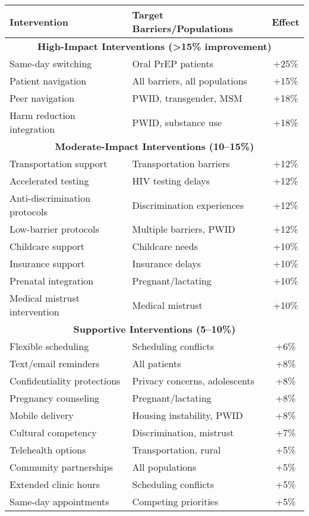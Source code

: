 \documentclass[11pt]{article}
\begin{document}
\begin{table}[h]
\small
\centering
\begin{tabular}{|p{4cm}|p{5cm}|c|}
\hline
\textbf{Intervention} & \textbf{Target Barriers/Populations} & \textbf{Effect} \\
\hline
\multicolumn{3}{|c|}{\textbf{High-Impact Interventions (>15\% improvement)}} \\
\hline
Same-day switching & Oral PrEP patients & +25\% \\
Patient navigation & All barriers, all populations & +15\% \\
Peer navigation & PWID, transgender, MSM & +18\% \\
Harm reduction integration & PWID, substance use & +18\% \\
\hline
\multicolumn{3}{|c|}{\textbf{Moderate-Impact Interventions (10--15\%)}} \\
\hline
Transportation support & Transportation barriers & +12\% \\
Accelerated testing & HIV testing delays & +12\% \\
Anti-discrimination protocols & Discrimination experiences & +12\% \\
Low-barrier protocols & Multiple barriers, PWID & +12\% \\
Childcare support & Childcare needs & +10\% \\
Insurance support & Insurance delays & +10\% \\
Prenatal integration & Pregnant/lactating & +10\% \\
Medical mistrust intervention & Medical mistrust & +10\% \\
\hline
\multicolumn{3}{|c|}{\textbf{Supportive Interventions (5--10\%)}} \\
\hline
Flexible scheduling & Scheduling conflicts & +6\% \\
Text/email reminders & All patients & +8\% \\
Confidentiality protections & Privacy concerns, adolescents & +8\% \\
Pregnancy counseling & Pregnant/lactating & +8\% \\
Mobile delivery & Housing instability, PWID & +8\% \\
Cultural competency & Discrimination, mistrust & +7\% \\
Telehealth options & Transportation, rural & +5\% \\
Community partnerships & All populations & +5\% \\
Extended clinic hours & Scheduling conflicts & +5\% \\
Same-day appointments & Competing priorities & +5\% \\
\hline
\end{tabular}
\end{table}
\end{document}
